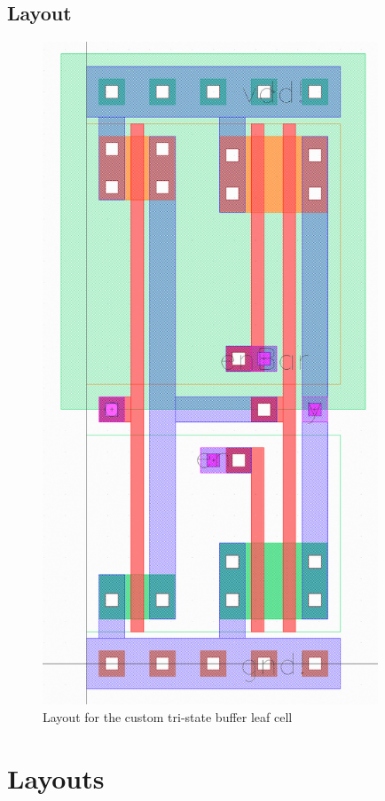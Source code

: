 \documentclass[12pt]{article}
\begin{document}
\begin{appendices}
    \subsection{Layout}
    \begin{figure}[H]
        \begin{center}
        \includegraphics[width=10cm]{HMMMTristateLayout.png}
        \caption{Layout for the custom tri-state buffer leaf cell}
        \end{center}
    \end{figure}
    \section{Layouts}

\end{appendices}
\end{document}
